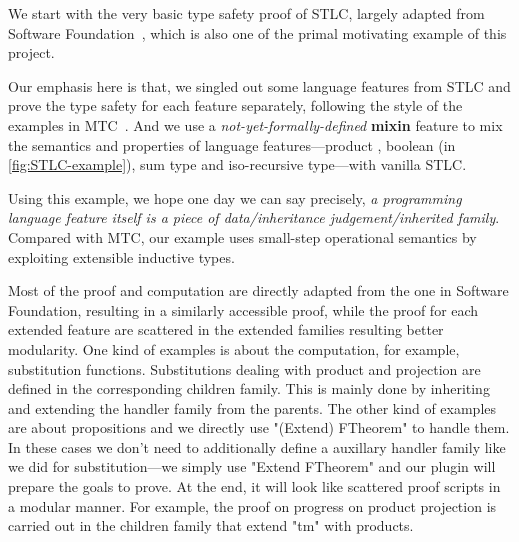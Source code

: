 We start with the very basic type safety proof of STLC, largely adapted
from Software Foundation~\cite{pierce2014software}, which is also one of
the primal motivating example of this project. 


Our emphasis here is that, we singled out some language features from
STLC and prove the type safety for each feature separately, following
the style of the examples in MTC~\cite{delaware2013,forsta2020}.
And we use a \textit{not-yet-formally-defined} \textbf{mixin} feature
to mix the semantics and properties of language features---product
, boolean (in \cref{fig:STLC-example}), sum type and iso-recursive type---with vanilla STLC.



Using this example,
we hope one day we can say precisely, \textit{a programming language feature itself is a
piece of data/inheritance judgement/inherited family}. Compared with MTC,
our example uses small-step operational semantics by exploiting
extensible inductive types. 

Most of the proof and computation are directly adapted
from the one in Software Foundation, resulting in a similarly accessible proof, while the proof for each extended feature are scattered in the extended families resulting better modularity. One kind of examples is about the computation, for example, substitution functions. Substitutions dealing with product and projection are defined in the corresponding children family. This is mainly done by inheriting and extending the handler family from the parents. The other kind of examples are about propositions and we directly use "(Extend) FTheorem" to handle them. In these cases we don't need to additionally define a auxillary handler family like we did for substitution---we simply use "Extend FTheorem" and our plugin will prepare the goals to prove. At the end, it will look like scattered proof scripts in a modular manner.
For example, the proof on progress on product projection is carried out in the children family that extend "tm" with products. 

